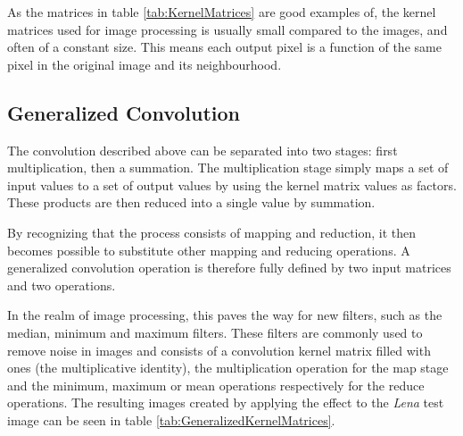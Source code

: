 As the matrices in table \ref{tab:KernelMatrices} are good examples of, the kernel matrices used for image processing is usually small compared to the images, and often of a constant size.
This means each output pixel is a function of the same pixel in the original image and its neighbourhood.

\subsection{Generalized Convolution}
The convolution described above can be separated into two stages: first multiplication, then a summation.
The multiplication stage simply maps a set of input values to a set of output values by using the kernel matrix values as factors.
These products are then reduced into a single value by summation.

By recognizing that the process consists of mapping and reduction,
it then becomes possible to substitute other mapping and reducing operations.
A generalized convolution operation is therefore fully defined by two input matrices and two operations.

In the realm of image processing, this paves the way for new filters, such as the median, minimum and maximum filters.
These filters are commonly used to remove noise in images and consists of a convolution kernel matrix filled with ones (the multiplicative identity),
the multiplication operation for the map stage
and the minimum, maximum or mean operations respectively for the reduce operations.
The resulting images created by applying the effect to the \textit{Lena} test image can be seen in table \ref{tab:GeneralizedKernelMatrices}.

